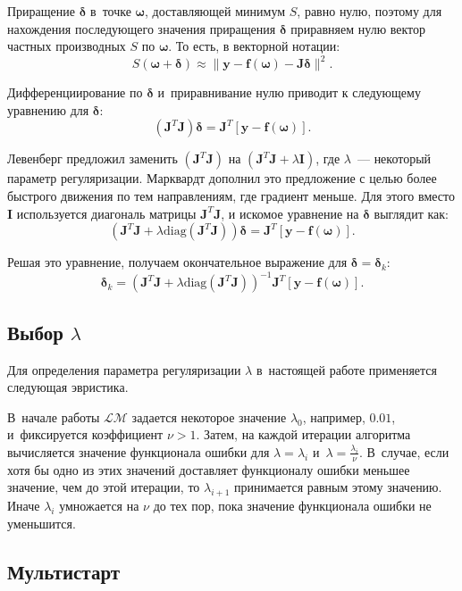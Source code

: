 \documentclass[12pt,a4paper]{article}
\begin{document}
Приращение $\boldsymbol{\delta}$ в~точке $\boldsymbol{\omega}$, доставляющей минимум $S$,
равно нулю, поэтому для нахождения последующего значения приращения $\boldsymbol{\delta}$
приравняем нулю вектор частных производных $S$ по $\boldsymbol{\omega}$. То есть,
в векторной нотации:
\[
S(\mathbf{\boldsymbol{\omega} + \boldsymbol{\delta}}) \approx \| \mathbf{y - f (\boldsymbol{\omega}) - J\boldsymbol{\delta}} \|^2.
\]

Дифференциирование по $\boldsymbol{\delta}$ и~приравнивание нулю приводит к
следующему уравнению для $\boldsymbol{\delta}$:
\[
(\mathbf{J}^T\mathbf{J})\boldsymbol{\delta} = \mathbf{J}^T [\mathbf{y - f(\boldsymbol{\omega})}].
\]

Левенберг предложил заменить $(\mathbf{J}^T\mathbf{J})$ на
$(\mathbf{J}^T\mathbf{J} + \lambda\mathbf{I})$, где $\lambda$~--- некоторый
параметр регуляризации. Марквардт дополнил это предложение с целью более
быстрого движения по тем направлениям, где градиент меньше. Для этого вместо
$\mathbf{I}$ используется диагональ матрицы $\mathbf{J}^T\mathbf{J}$, и
искомое уравнение на $\boldsymbol{\delta}$ выглядит как:
\[
(\mathbf{J}^T\mathbf{J} + \lambda \text{diag} (\mathbf{J}^T\mathbf{J}))\boldsymbol{\delta} = \mathbf{J}^T [\mathbf{y - f(\boldsymbol{\omega})}].
\]

Решая это уравнение, получаем окончательное выражение для
$\boldsymbol{\delta} = \boldsymbol{\delta}_k$:
\[
\boldsymbol{\delta}_k = (\mathbf{J}^T\mathbf{J} + \lambda \text{diag} (\mathbf{J}^T\mathbf{J}))^{-1} \mathbf{J}^T [\mathbf{y - f(\boldsymbol{\omega})}].
\]

\subsection{Выбор $\lambda$}

Для определения параметра регуляризации $\lambda$ в~настоящей работе
применяется следующая эвристика.

В~начале работы $\mathcal{LM}$ задается некоторое значение $\lambda_0$,
например, $0.01$, и~фиксируется коэффициент $\nu > 1$. Затем, на каждой
итерации алгоритма вычисляется значение функционала ошибки для
$\lambda = \lambda_i$ и~$\lambda = \frac{\lambda_i}{\nu}$. В~случае,
если хотя бы одно из этих значений доставляет функционалу ошибки
меньшее значение, чем до этой итерации, то $\lambda_{i+1}$ принимается
равным этому значению. Иначе $\lambda_i$ умножается на $\nu$ до тех
пор, пока значение функционала ошибки не уменьшится.

\subsection{Мультистарт}
\end{document}
